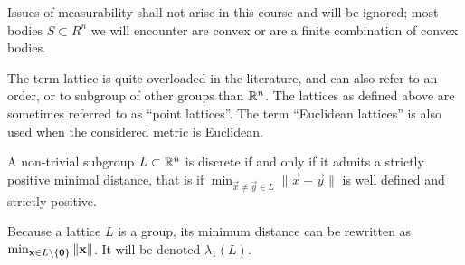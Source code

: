 Issues of measurability shall not arise in this course and will be ignored; most bodies $S \subset R^n$ we will encounter are convex or are a finite combination of convex bodies. 

\begin{remark} The term lattice is quite overloaded in the literature, and can also refer to an order, or to subgroup of other groups than $\mathbb{R}^n$. The lattices as defined above are sometimes referred to as ``point lattices''. The term ``Euclidean lattices'' is also used when the considered metric is Euclidean.
\end{remark}

\begin{proposition}\label{prop:minimumExists} A non-trivial subgroup $L \subset \mathbb{R}^n$ is discrete if and only if it admits a strictly positive minimal distance, that is if $\min_{\vec x \neq \vec y \in L} \|\vec x - \vec y\|$ is well defined and strictly positive.
\end{proposition}
Because a lattice $L$ is a group, its minimum distance can be rewritten as $\min_{\mathbf{x} \in L \setminus\{\mathbf{0}\}} \|\mathbf{x}\|$. It will be denoted $\lambda_1(L)$.

